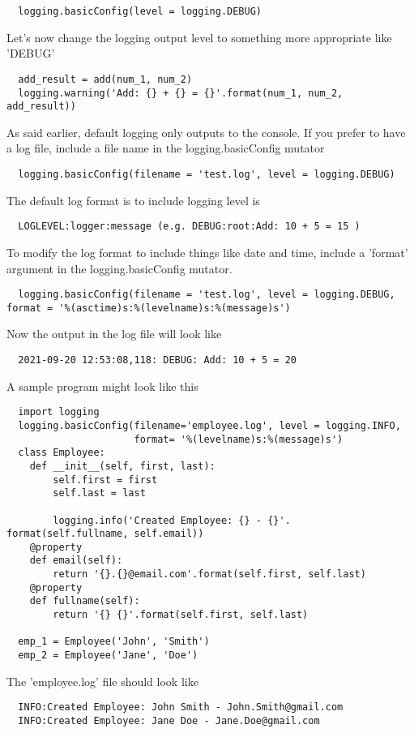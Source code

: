 \documentclass{article}%
\begin{document}
\begin{lstlisting}
  logging.basicConfig(level = logging.DEBUG)
\end{lstlisting}
Let's now change the logging output level to something more appropriate like 'DEBUG'
\begin{lstlisting}
  add_result = add(num_1, num_2)
  logging.warning('Add: {} + {} = {}'.format(num_1, num_2, add_result))
\end{lstlisting}
As said earlier, default logging only outputs to the console. If you prefer to have a log file, include a file name in the logging.basicConfig mutator
\begin{lstlisting}
  logging.basicConfig(filename = 'test.log', level = logging.DEBUG)
\end{lstlisting}
The default log format is to include logging level is 
\begin{lstlisting}
  LOGLEVEL:logger:message (e.g. DEBUG:root:Add: 10 + 5 = 15 )
\end{lstlisting}
To modify the log format to include things like date and time, include a 'format' argument in the logging.basicConfig mutator. 
\begin{lstlisting}
  logging.basicConfig(filename = 'test.log', level = logging.DEBUG, format = '%(asctime)s:%(levelname)s:%(message)s')
\end{lstlisting}
Now the output in the log file will look like
\begin{lstlisting}
  2021-09-20 12:53:08,118: DEBUG: Add: 10 + 5 = 20
\end{lstlisting}
A sample program might look like this
\begin{lstlisting}
  import logging
  logging.basicConfig(filename='employee.log', level = logging.INFO,
                      format= '%(levelname)s:%(message)s')
  class Employee:
    def __init__(self, first, last):
        self.first = first
        self.last = last

        logging.info('Created Employee: {} - {}'. format(self.fullname, self.email))
    @property
    def email(self):
        return '{}.{}@email.com'.format(self.first, self.last)
    @property
    def fullname(self):
        return '{} {}'.format(self.first, self.last)
  
  emp_1 = Employee('John', 'Smith')
  emp_2 = Employee('Jane', 'Doe')
\end{lstlisting}
The 'employee.log' file should look like
\begin{lstlisting}
  INFO:Created Employee: John Smith - John.Smith@gmail.com
  INFO:Created Employee: Jane Doe - Jane.Doe@gmail.com
\end{lstlisting}
\end{document}
